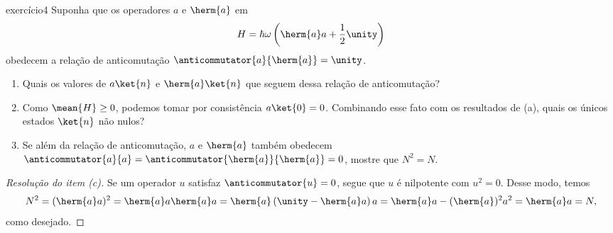 \begin{exercício}{}{exercício4}
    Suponha que os operadores \(a\) e \(\herm{a}\) em
    \begin{equation*}
        H = \hbar \omega \left(\herm{a}a + \frac12\unity\right)
    \end{equation*}
    obedecem a relação de anticomutação \(\anticommutator{a}{\herm{a}} = \unity\).
    \begin{enumerate}[label=(\alph*)]
        \item Quais os valores de \(a\ket{n}\) e \(\herm{a}\ket{n}\) que seguem dessa relação de anticomutação?
        \item Como \(\mean{H} \geq 0\), podemos tomar por consistência \(a\ket{0} = 0\). Combinando esse fato com os resultados de (a), quais os únicos estados \(\ket{n}\) não nulos?
        \item Se além da relação de anticomutação, \(a\) e \(\herm{a}\) também obedecem \(\anticommutator{a}{a} = \anticommutator{\herm{a}}{\herm{a}} = 0\), mostre que \(N^2 = N\).
    \end{enumerate}
\end{exercício}
\begin{proof}[Resolução do item (c)]
    Se um operador \(u\) satisfaz \(\anticommutator{u} = 0\), segue que \(u\) é nilpotente com \(u^2 = 0\). Desse modo, temos
    \begin{equation*}
        N^2 = (\herm{a}a)^2 = \herm{a}a\herm{a}a = \herm{a}\left(\unity - \herm{a}a\right)a = \herm{a}a - (\herm{a})^2a^2 = \herm{a}a = N,
    \end{equation*}
    como desejado.
\end{proof}
